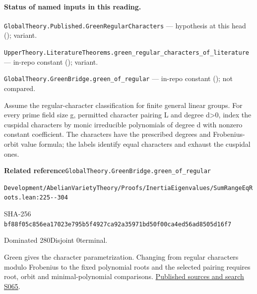

\paragraph{Status of named inputs in this reading.}
\noindent\nolinkurl{GlobalTheory.Published.GreenRegularCharacters} --- hypothesis at this head (); variant.\par
\noindent\nolinkurl{UpperTheory.LiteratureTheorems.green_regular_characters_of_literature} --- in-repo constant (); variant.\par
\noindent\nolinkurl{GlobalTheory.GreenBridge.green_of_regular} --- in-repo constant (); not compared.\par

\begin{formalstatement}[D575]\label{decomp:D575}
Assume the regular-character classification for finite general linear groups. For every prime field size g, permitted character pairing L and degree d>0, index the cuspidal characters by monic irreducible polynomials of degree d with nonzero constant coefficient. The characters have the prescribed degrees and Frobenius-orbit value formula; the labels identify equal characters and exhaust the cuspidal ones.
\end{formalstatement}
{\small\raggedright\noindent\textsf{\bfseries Related reference}\quad \nolinkurl{GlobalTheory.GreenBridge.green_of_regular}\par\noindent \nolinkurl{Development/AbelianVarietyTheory/Proofs/InertiaEigenvalues/SumRangeEqRoots.lean:225--304}\par\noindent SHA-256 \nolinkurl{bf88f05c856ea17023e795b5f4927ca92a35971bd50f00ca4ed56ad8505d16f7}\par\noindent Dominated 280\quad Disjoint 0\quad terminal.\par}
Green gives the character parametrization. Changing from regular characters modulo Frobenius to the fixed polynomial roots and the selected pairing requires root, orbit and minimal-polynomial comparisons.
\hyperref[lit:S065]{Published sources and search S065}.
